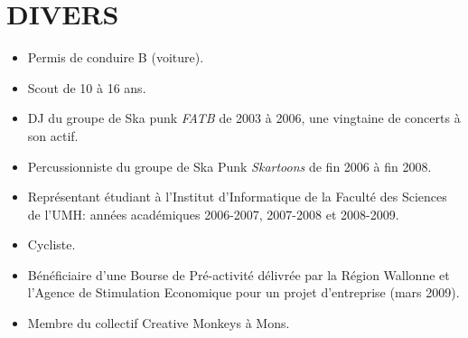 \section{DIVERS}

\begin{itemize}

\item Permis de conduire B (voiture).

\item Scout de 10 à 16 ans.

\item DJ du groupe de Ska punk \emph{FATB} de 2003 à 2006, une vingtaine de
concerts à son actif.

\item Percussionniste du groupe de Ska Punk \emph{Skartoons} de fin 2006 à fin
2008.

\item Représentant étudiant à l'Institut d'Informatique de la Faculté des
Sciences de l'UMH: années académiques 2006-2007, 2007-2008 et 2008-2009.

\item Cycliste.

\item Bénéficiaire d'une Bourse de Pré-activité délivrée par la Région Wallonne
et l'Agence de Stimulation Economique pour un projet d'entreprise (mars 2009).

\item Membre du collectif Creative Monkeys à Mons.

\end{itemize}
